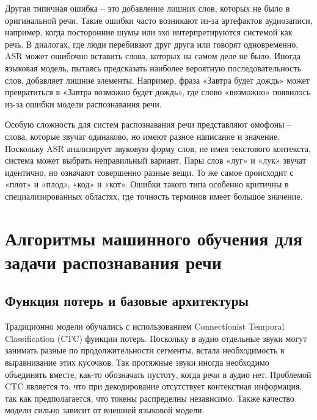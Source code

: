 Другая типичная ошибка -- это добавление лишних слов, которых не было в оригинальной речи.
Такие ошибки часто возникают из-за артефактов аудиозаписи, например, когда посторонние шумы или эхо интерпретируются системой как речь.
В диалогах, где люди перебивают друг друга или говорят одновременно, ASR может ошибочно вставить слова, которых на самом деле не было.
Иногда языковая модель, пытаясь предсказать наиболее вероятную последовательность слов, добавляет лишние элементы.
Например, фраза «Завтра будет дождь» может превратиться в «Завтра возможно будет дождь», где слово «возможно» появилось из-за ошибки модели распознавания речи.

Особую сложность для систем распознавания речи представляют омофоны -- слова, которые звучат одинаково, но имеют разное написание и значение.
Поскольку ASR анализирует звуковую форму слов, не имея текстового контекста, система может выбрать неправильный вариант.
Пары слов «луг» и «лук» звучат идентично, но означают совершенно разные вещи.
То же самое происходит с «плот» и «плод», «код» и «кот».
Ошибки такого типа особенно критичны в специализированных областях, где точность терминов имеет большое значение.

\section{Алгоритмы машинного обучения для задачи распознавания речи}

\subsection{Функция потерь и базовые архитектуры}

Традиционно модели обучались с использованием Connectionist Temporal Classification (CTC) функции потерь\cite{graves2006connectionist}.
Поскольку в аудио отдельные звуки могут занимать разные по продолжительности сегменты, встала необходимость в выравнивание этих кусочков.
Так протяжные звуки иногда необходимо объединять вместе, как-то обозначать пустоту, когда речи в аудио нет.
Проблемой CTC является то, что при декодирование отсутствует контекстная информация, так как предполагается, что токены распределны независимо.
Также качество модели сильно зависит от внешней языковой модели.


